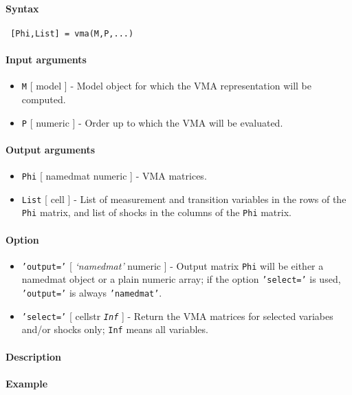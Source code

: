 


	\paragraph{Syntax}
 
 \begin{verbatim}
 [Phi,List] = vma(M,P,...)
 \end{verbatim}
 
 \paragraph{Input arguments}
 
 \begin{itemize}
 \item
   \texttt{M} {[} model {]} - Model object for which the VMA
   representation will be computed.
 \item
   \texttt{P} {[} numeric {]} - Order up to which the VMA will be
   evaluated.
 \end{itemize}
 
 \paragraph{Output arguments}
 
 \begin{itemize}
 \item
   \texttt{Phi} {[} namedmat \textbar{} numeric {]} - VMA matrices.
 \item
   \texttt{List} {[} cell {]} - List of measurement and transition
   variables in the rows of the \texttt{Phi} matrix, and list of shocks
   in the columns of the \texttt{Phi} matrix.
 \end{itemize}
 
 \paragraph{Option}
 
 \begin{itemize}
 \item
   \texttt{'output='} {[} \emph{`namedmat'} \textbar{} numeric {]} -
   Output matrix \texttt{Phi} will be either a namedmat object or a plain
   numeric array; if the option \texttt{'select='} is used,
   \texttt{'output='} is always \texttt{'namedmat'}.
 \item
   \texttt{'select='} {[} cellstr \textbar{} \emph{\texttt{Inf}} {]} -
   Return the VMA matrices for selected variabes and/or shocks only;
   \texttt{Inf} means all variables.
 \end{itemize}
 
 \paragraph{Description}
 
 \paragraph{Example}


